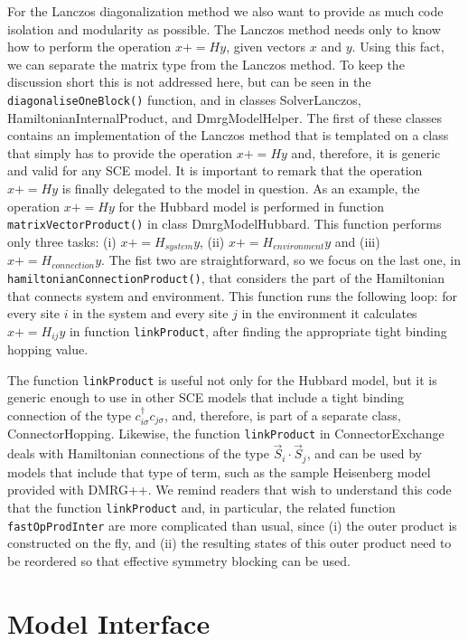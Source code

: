 \documentclass[paper=letter]{scrartcl}
\newcommand{\cppClass}[1]{{\sffamily #1}}
\newcommand{\cppFunction}[1]{{\tt #1}}
\begin{document}
For the Lanczos diagonalization method we also want to provide as much code isolation and modularity as possible. 
The Lanczos method needs only to know how
to perform the operation $x+=Hy$, given vectors $x$ and $y$. Using this fact, we can separate the matrix type from the Lanczos method.
To keep the discussion short this is not addressed here, but can be seen in the \cppFunction{diagonaliseOneBlock()} function, and in 
classes \cppClass{SolverLanczos}, \cppClass{HamiltonianInternalProduct}, and \cppClass{DmrgModelHelper}.
The first of these classes contains an implementation of the Lanczos method that is templated on
a class that simply has to provide the operation $x+=Hy$ and, therefore, it is generic and valid for any SCE model.
It is important to remark that the operation  $x+=Hy$ is finally delegated to the model in question.
As an example,  the operation $x+=Hy$ for the Hubbard model is performed in function \cppFunction{matrixVectorProduct()} in class \cppClass{DmrgModelHubbard}. 
This function performs only three tasks: (i)  $x+=H_{system}y$, (ii) $x+=H_{environment}y$ and (iii) $x+=H_{connection}y$.
The fist two are straightforward, so we focus on the last one, in \cppFunction{hamiltonianConnectionProduct()}, 
that considers the part of the Hamiltonian
that connects system and environment. This function runs the following loop: for every site $i$ in the system and every site $j$ in the environment
it calculates $x+=H_{ij}y$ in function \cppFunction{linkProduct}, after finding the appropriate tight binding hopping value.

The function \cppFunction{linkProduct} is useful not only for the Hubbard model, but it is
 generic enough to use in other SCE models that include a tight binding connection of the type $c^\dagger_{i\sigma}c_{j\sigma}$,
  and, therefore, is part of a separate class,
 \cppClass{ConnectorHopping}. Likewise, the function \cppFunction{linkProduct} in \cppClass{ConnectorExchange} deals 
 with Hamiltonian connections of the type $\vec{S}_i\cdot\vec{S}_j$, and can be used by models that include that type of term, such as the 
 sample Heisenberg model provided with DMRG++.
We remind readers that wish to understand this code that the function \cppFunction{linkProduct} and, in particular, the 
related function \cppFunction{fastOpProdInter} are more complicated than usual, since (i) the outer product is constructed on the fly, and (ii)
the resulting states of this outer product need to be reordered so that effective symmetry blocking can be used.

\section{Model Interface}\label{subsec:models}
\end{document}
